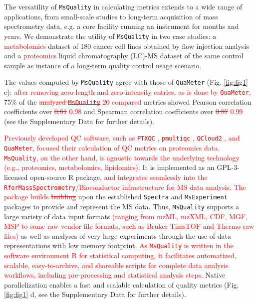 \documentclass[unnumsec,webpdf,contemporary,large]{oup-authoring-template}%
\theoremstyle{thmstyleone}%
\theoremstyle{thmstyletwo}%
\theoremstyle{thmstylethree}%
\begin{document}
The versatility of \texttt{MsQuality} in calculating metrics extends to a wide range of
applications, from small-scale studies to long-term acquisition of mass spectrometry
data, e.g. a core facility running an instrument for months and years. 
We demonstrate the utility of \texttt{MsQuality} in two case studies: a 
\textcolor{red}{metabolomics}
dataset of 180 cancer cell lines obtained by flow injection analysis
\citep{Cherkaoui2022} and a \textcolor{red}{proteomics} liquid chromatography
 (LC)-MS dataset of the same 
control sample \citep{Amidan2014} as instance of a long-term quality control 
usage scenario. 

The values computed by \texttt{MsQuality}
agree with those of \texttt{QuaMeter} \citep{Ma2012} (Fig. \ref{fig:fig1} c): 
\textcolor{red}{after removing zero-length and zero-intensity entries, as is done by \texttt{QuaMeter},}
75\% of the \textcolor{red}{\sout{analyzed \texttt{MsQuality}} 20 compared} metrics showed Pearson correlation 
coefficients over \textcolor{red}{\sout{0.81} 0.98} and Spearman correlation coefficients 
over \textcolor{red}{\sout{0.87} 0.99} (see the Supplementary Data for further details).

\textcolor{red}{Previously developed QC software, such as \texttt{PTXQC} \citep{Bielow2016}, 
\texttt{pmultiqc} \citep{Riverol2023}, \texttt{QCloud2} \citep{Olivella2021}, and \texttt{QuaMeter}, 
focused their calculation of QC metrics on proteomics data. \texttt{MsQuality}, on the other hand, is 
agnostic towards the underlying technology (e.g., proteomics, metabolomics, lipidomics).}
It is implemented as an GPL-3-licensed open-source R package, 
\textcolor{red}{and integrates seamlessly into the 
\texttt{RforMassSpectrometry}/Bioconductor infrastructure for MS data analysis.}
\textcolor{red}{The package builds} \textcolor{red}{\sout{building}} 
upon the established \texttt{Spectra} and \texttt{MsExperiment} packages
\citep{Rainer2022} to provide and represent the MS data. Thus, \texttt{MsQuality} 
supports a large variety of data input formats
\textcolor{red}{(ranging from mzML, mzXML, CDF, MGF, MSP to some raw vendor 
file formats, such as Bruker TimsTOF and Thermo raw files)}
as well as analyses of very large experiments through the use of data
representations with low memory footprint. 
\textcolor{red}{As \texttt{MsQuality} is written in the software environment R for statistical computing, it facilitates 
automatized, scalable, easy-to-archive, and shareable scripts for complete 
data analysis workflows, including pre-processing and statistical analysis steps.}
Native parallelization enables a fast
and scalable calculation of quality metrics (Fig. \ref{fig:fig1} d, 
see the Supplementary Data for further details).
\end{document}
